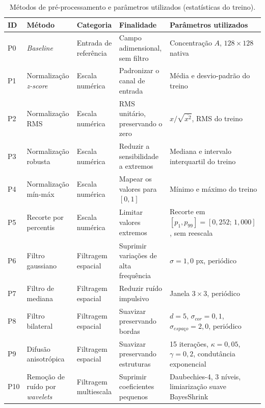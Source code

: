 \documentclass[final,5p,times,twocolumn]{elsarticle}
\begin{document}
\begin{table}[t]
    \centering
    \caption{Métodos de pré-processamento e parâmetros utilizados (estatísticas do treino).}
    \label{tab:preprocessing}
    \small
    \begin{tabularx}{\textwidth}{L{0.65cm} L{3.0cm} L{2.35cm} Y Y}
        \toprule
        \textbf{ID} & \textbf{Método} & \textbf{Categoria} &
        \textbf{Finalidade} & \textbf{Parâmetros utilizados} \\
        \midrule
        P0 & \textit{Baseline} & Entrada de referência &
        Campo adimensional, sem filtro & Concentração $A$, $128\times128$ nativa \\
        P1 & Normalização \textit{z-score} & Escala numérica &
        Padronizar o canal de entrada & Média e desvio-padrão do treino \\
        P2 & Normalização RMS & Escala numérica &
        RMS unitário, preservando o zero & $x/\sqrt{\overline{x^2}}$, RMS do treino \\
        P3 & Normalização robusta & Escala numérica &
        Reduzir a sensibilidade a extremos & Mediana e intervalo interquartil do treino \\
        P4 & Normalização mín-máx & Escala numérica &
        Mapear os valores para $[0,1]$ & Mínimo e máximo do treino \\
        P5 & Recorte por percentis & Escala numérica &
        Limitar valores extremos & Recorte em $[p_1,p_{99}]=[0,252;\,1,000]$, sem reescala \\
        P6 & Filtro gaussiano & Filtragem espacial &
        Suprimir variações de alta frequência & $\sigma=1,0$ px, periódico \\
        P7 & Filtro de mediana & Filtragem espacial &
        Reduzir ruído impulsivo & Janela $3\times3$, periódico \\
        P8 & Filtro bilateral & Filtragem espacial &
        Suavizar preservando bordas & $d=5$, $\sigma_{cor}=0,1$, $\sigma_{espaço}=2,0$, periódico \\
        P9 & Difusão anisotrópica & Filtragem espacial &
        Suavizar preservando estruturas & 15 iterações, $\kappa=0,05$, $\gamma=0,2$, condutância exponencial \\
        P10 & Remoção de ruído por \textit{wavelets} & Filtragem multiescala &
        Suprimir coeficientes pequenos & Daubechies-4, 3 níveis, limiarização suave BayesShrink \\
        \bottomrule
    \end{tabularx}
\end{table}
\end{document}
